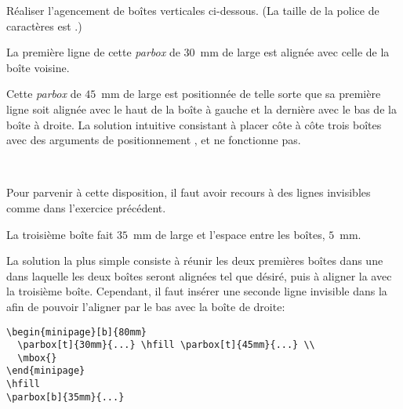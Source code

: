 \begin{exercice}
  Réaliser l'agencement de boîtes verticales ci-dessous. (La taille de
  la police de caractères est .)
  \begin{center}
    \begin{minipage}{120mm}
      \footnotesize
      \begin{minipage}[b]{80mm}
        \parbox[t]{30mm}{La première ligne de cette \emph{parbox} de
          $30$~mm de large est alignée avec celle de la boîte
          voisine.}
        \hfill
        \parbox[t]{45mm}{Cette \emph{parbox} de $45$~mm de large est
          positionnée de telle sorte que sa première ligne soit
          alignée avec le haut de la boîte à gauche et la dernière
          avec le bas de la boîte à droite. La solution intuitive
          consistant à placer côte à côte trois boîtes avec des
          arguments de positionnement ,  et 
          ne fonctionne pas.} \\
        \mbox{}
      \end{minipage}
      \hfill
      \parbox[b]{35mm}{Pour parvenir à cette disposition, il faut
        avoir recours à des lignes invisibles comme dans l'exercice
        précédent.}
    \end{minipage}
  \end{center}
  La troisième boîte fait $35$~mm de large et l'espace entre les
  boîtes, $5$~mm.
  \begin{sol}
    La solution la plus simple consiste à réunir les deux premières
    boîtes dans une  dans laquelle les deux boîtes seront
    alignées tel que désiré, puis à aligner la  avec la
    troisième boîte. Cependant, il faut insérer une seconde ligne
    invisible dans la  afin de pouvoir l'aligner par le
    bas avec la boîte de droite:
\begin{lstlisting}
\begin{minipage}[b]{80mm}
  \parbox[t]{30mm}{...} \hfill \parbox[t]{45mm}{...} \\
  \mbox{}
\end{minipage}
\hfill
\parbox[b]{35mm}{...}
\end{lstlisting}
  \end{sol}
\end{exercice}


